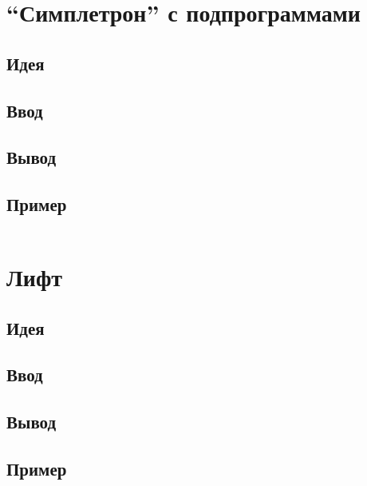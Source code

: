 \documentclass[12pt, oneside]{article}
\begin{document}
\begin{tabular}{| p{} |}
\hline
\\
\hline
\end{tabular}

\section{``Симплетрон'' с подпрограммами}

\subsection*{Идея}

\subsection*{Ввод}

\subsection*{Вывод}

\subsection*{Пример}

\begin{tabular}{| p{} |}
\hline
\\
\hline
\end{tabular}

\section{Лифт}

\subsection*{Идея}

\subsection*{Ввод}

\subsection*{Вывод}

\subsection*{Пример}
\end{document}
